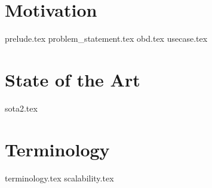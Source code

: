 \chapter{Motivation}\label{cha:motivation}
{prelude.tex}
{problem_statement.tex}
{obd.tex}
{usecase.tex}
\chapter{State of the Art}\label{cha:sota}
{sota2.tex}
\chapter{Terminology}
{terminology.tex}
{scalability.tex}
